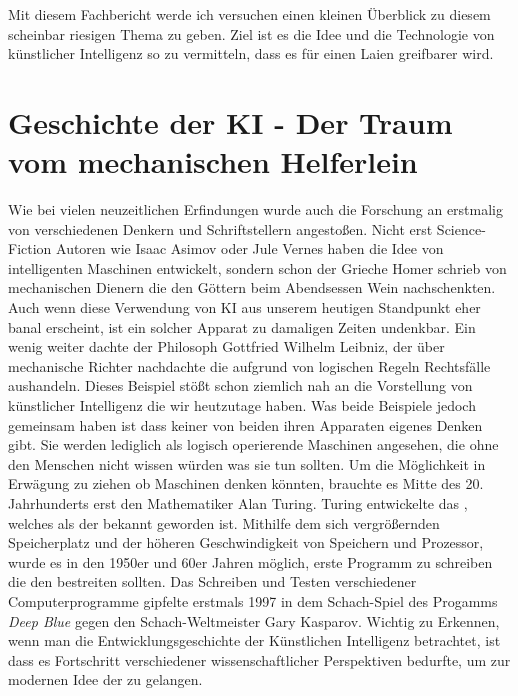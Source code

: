 \documentclass[a4paper,12pt,german,ngerman]{report}
\begin{document}
    Mit diesem Fachbericht werde ich versuchen einen kleinen Überblick zu diesem scheinbar riesigen Thema zu geben.
    Ziel ist es die Idee und die Technologie von künstlicher Intelligenz so zu vermitteln, dass es für einen Laien greifbarer wird.


    \chapter{Geschichte der KI - Der Traum vom mechanischen Helferlein}
    Wie bei vielen neuzeitlichen Erfindungen wurde auch die Forschung an 
    erstmalig von verschiedenen Denkern und Schriftstellern angestoßen.
    Nicht erst Science-Fiction Autoren wie Isaac Asimov oder Jule Vernes haben die Idee von intelligenten Maschinen
    entwickelt, sondern schon der Grieche Homer schrieb von mechanischen Dienern die den Göttern beim Abendsessen
    Wein nachschenkten.\autocite[53]{buchanan2005very} Auch wenn diese Verwendung von KI aus unserem heutigen Standpunkt
    eher banal erscheint, ist ein solcher Apparat zu damaligen Zeiten undenkbar.
    Ein wenig weiter dachte der Philosoph Gottfried Wilhelm Leibniz, der über mechanische Richter nachdachte
    die aufgrund von logischen Regeln Rechtsfälle aushandeln.\autocite[53]{buchanan2005very}
    Dieses Beispiel stößt schon ziemlich nah an die Vorstellung von künstlicher Intelligenz die wir heutzutage haben.
    Was beide Beispiele jedoch gemeinsam haben ist dass keiner von beiden ihren Apparaten eigenes Denken
    gibt. Sie werden lediglich als logisch operierende Maschinen angesehen, die ohne den Menschen nicht wissen würden
    was sie tun sollten.
    Um die Möglichkeit in Erwägung zu ziehen ob Maschinen denken könnten,
    brauchte es Mitte des 20. Jahrhunderts erst den Mathematiker Alan Turing.\autocite{sesink1993menschliche}
    Turing entwickelte das , welches als der  bekannt geworden ist.
    Mithilfe dem sich vergrößernden Speicherplatz und der höheren Geschwindigkeit von Speichern und Prozessor,
    wurde es in den 1950er und 60er Jahren möglich, erste Programm zu schreiben die den  bestreiten sollten.
    Das Schreiben und Testen verschiedener Computerprogramme gipfelte erstmals 1997 in dem Schach-Spiel des Progamms \emph{Deep Blue}
    gegen den Schach-Weltmeister Gary Kasparov.\autocite{hsu1999ibm}
    Wichtig zu Erkennen, wenn man die Entwicklungsgeschichte der Künstlichen Intelligenz betrachtet, ist dass es Fortschritt verschiedener
    wissenschaftlicher Perspektiven\autocite{buchanan2005very} bedurfte, um zur modernen Idee der  zu gelangen.
\end{document}
